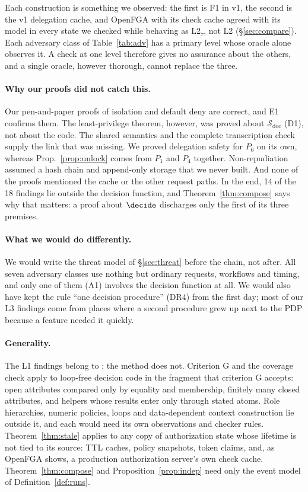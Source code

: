 Each construction is something we observed: the first is F1 in \sysname v1, the second is the v1 delegation
cache, and OpenFGA with its check cache agreed with its model in every state we checked while behaving as
L2$_\tau$, not L2 (\S\ref{sec:compare}). Each
adversary class of Table~\ref{tab:adv} has a primary level whose oracle alone observes it. A check at one level
therefore gives no assurance about the others, and a single oracle, however thorough, cannot replace the three.

\paragraph{Why our proofs did not catch this.} Our pen-and-paper proofs of isolation and default deny are
correct, and E1 confirms them. The least-privilege theorem, however, was proved about $\mathcal{S}_{\mathrm{doc}}$
(D1), not about the code. The shared semantics and the complete transcription check supply the link that
was missing. We proved delegation safety for $P_6$ on its own, whereas Prop.~\ref{prop:unlock} comes from $P_1$ and
$P_4$ together. Non-repudiation assumed a hash chain and append-only storage that we never built. And none of the
proofs mentioned the cache or the other request paths. In the end, 14 of the 18 findings lie outside the decision
function, and Theorem~\ref{thm:compose} says why that matters: a proof about $\decide$ discharges only the first of
its three premises.

\paragraph{What we would do differently.} We would write the threat model of \S\ref{sec:threat} before the
chain, not after. All seven adversary classes use nothing but ordinary requests, workflows and timing, and only
one of them (A1) involves the decision function at all. We would also have kept the rule ``one decision procedure''
(DR4) from the first day; most of our L3 findings come from places where a second procedure grew up next to the
PDP because a feature needed it quickly.

\paragraph{Generality.} The L1 findings belong to \chain; the method does not. Criterion G and the coverage check
apply to loop-free decision code in the fragment that criterion G accepts: open attributes compared only by
equality and membership, finitely many closed attributes, and helpers whose results enter only through stated
atoms. Role hierarchies, numeric policies, loops and data-dependent context construction lie outside it, and
each would need its own observations and checker rules. Theorem~\ref{thm:stale} applies to any copy of authorization state whose lifetime is
not tied to its source: TTL caches, policy snapshots, token claims, and, as OpenFGA shows, a production
authorization server's own check cache. Theorem~\ref{thm:compose} and Proposition~\ref{prop:indep} need only the
event model of Definition~\ref{def:runs}.

